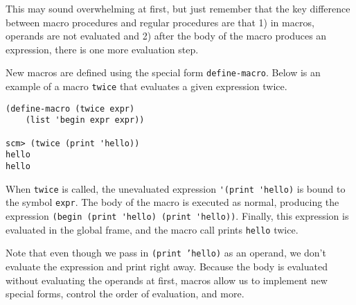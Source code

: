 This may sound overwhelming at first, but just remember that the key difference between macro procedures and regular procedures are that 1) in macros, operands are not evaluated and 2) after the body of the macro produces an expression, there is one more evaluation step.  

New macros are defined using the special form \lstinline{define-macro}. Below is an example of a macro \lstinline{twice} that evaluates a given expression twice. 

\begin{lstlisting}
(define-macro (twice expr)
    (list 'begin expr expr))

scm> (twice (print 'hello))
hello
hello
\end{lstlisting}

When \texttt{twice} is called, the unevaluated expression \lstinline{'(print 'hello)} is bound to the symbol \lstinline{expr}. The body of the macro is executed as normal, producing the expression \lstinline{(begin (print 'hello) (print 'hello))}. Finally, this expression is evaluated in the global frame, and the macro call prints \lstinline{hello} twice. 

Note that even though we pass in \texttt{(print 'hello)} as an operand, we don't evaluate the expression and print right away. Because the body is evaluated without evaluating the operands at first, macros allow us to implement new special forms, control the order of evaluation, and more. 